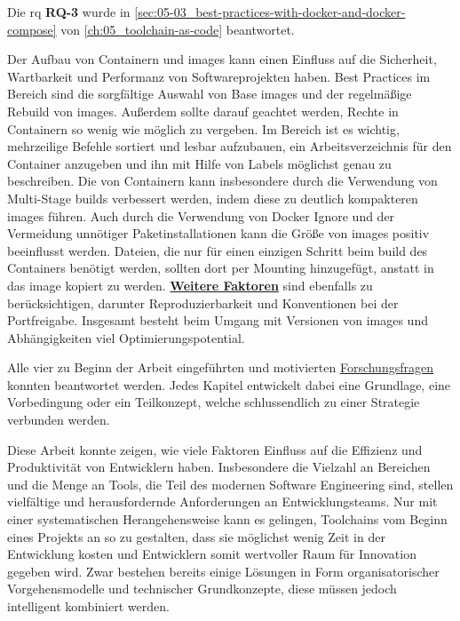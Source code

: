 Die \acrlong{rq} \textbf{RQ-3} wurde in \autoref{sec:05-03_best-practices-with-docker-and-docker-compose} von \autoref{ch:05_toolchain-as-code} beantwortet.

Der Aufbau von Containern und \Glspl{image} kann einen Einfluss auf die Sicherheit, Wartbarkeit und Performanz von Softwareprojekten haben. Best Practices im Bereich \textbf{} sind die sorgfältige Auswahl von Base \Glspl{image} und der regelmäßige Rebuild von \Glspl{image}. Außerdem sollte darauf geachtet werden, Rechte in Containern so wenig wie möglich zu vergeben. Im Bereich \textbf{} ist es wichtig, mehrzeilige Befehle sortiert und lesbar aufzubauen, ein Arbeitsverzeichnis für den Container anzugeben und ihn mit Hilfe von Labels möglichst genau zu beschreiben. Die \textbf{} von Containern kann insbesondere durch die Verwendung von Multi-Stage \Glspl{build} verbessert werden, indem diese zu deutlich kompakteren \Glspl{image} führen. Auch durch die Verwendung von Docker Ignore und der Vermeidung unnötiger Paketinstallationen kann die Größe von \Glspl{image} positiv beeinflusst werden. Dateien, die nur für einen einzigen Schritt beim \Gls{build} des Containers benötigt werden, sollten dort per Mounting hinzugefügt, anstatt in das \Gls{image} kopiert zu werden. \textbf{\hyperref[subsec:05-03-04_further]{Weitere Faktoren}} sind ebenfalls zu berücksichtigen, darunter Reproduzierbarkeit und Konventionen bei der Portfreigabe. Insgesamt besteht beim Umgang mit Versionen von \Glspl{image} und Abhängigkeiten viel Optimierungspotential.

\vspace{2em}

Alle vier zu Beginn der Arbeit eingeführten und motivierten \hyperref[sec:01-03_objectives-and-research-questions]{Forschungsfragen} konnten beantwortet werden. Jedes Kapitel entwickelt dabei eine Grundlage, eine Vorbedingung oder ein Teilkonzept, welche schlussendlich zu einer Strategie verbunden werden.

Diese Arbeit konnte zeigen, wie viele Faktoren Einfluss auf die Effizienz und Produktivität von Entwicklern haben. Insbesondere die Vielzahl an Bereichen und die Menge an Tools, die Teil des modernen Software Engineering sind, stellen vielfältige und herausfordernde Anforderungen an Entwicklungsteams. Nur mit einer systematischen Herangehensweise kann es gelingen, Toolchains vom Beginn eines Projekts an so zu gestalten, dass sie möglichst wenig Zeit in der Entwicklung kosten und Entwicklern somit wertvoller Raum für Innovation gegeben wird. Zwar bestehen bereits einige Lösungen in Form organisatorischer Vorgehensmodelle und technischer Grundkonzepte, diese müssen jedoch intelligent kombiniert werden.

